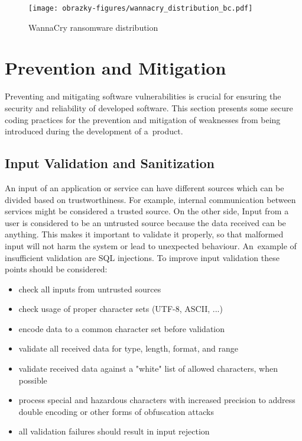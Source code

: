   \begin{figure}[h]
    \centering
    \texttt{[image: obrazky-figures/wannacry\_distribution\_bc.pdf]}
    \caption{WannaCry ransomware distribution}
    \label{wannacryDistribution}
  \end{figure}

  \section{Prevention and Mitigation}
  Preventing and mitigating software vulnerabilities is crucial for ensuring the security and reliability
  of developed software. This section presents some secure coding practices for the prevention
  and mitigation of weaknesses from being introduced during the development of a~product.

  \subsection*{Input Validation and Sanitization}
    An input of an application or service can have different sources which can be divided based on trustworthiness.
    For example, internal communication between services might be considered a trusted source. On the other side,
    Input from a user is considered to be an untrusted source because the data received can be anything.
    This makes it important to validate it properly, so that malformed input will not harm the system or lead
    to unexpected behaviour. An~example of insufficient validation are SQL injections. To improve input
    validation these points should be considered:
    \begin{itemize}
      \item check all inputs from untrusted sources
      \item check usage of proper character sets (UTF-8, ASCII, ...)
      \item encode data to a common character set before validation
      \item validate all received data for type, length, format, and range
      \item validate received data against a "white" list of allowed characters, when possible
      \item process special and hazardous characters with increased precision to address double encoding or other
            forms of obfuscation attacks
      \item all validation failures should result in input rejection
    \end{itemize}

